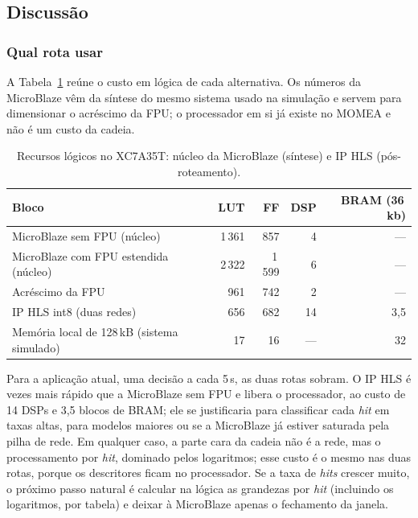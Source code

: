 \subsection{Discussão}
\label{sim:sec:discussao}

\subsubsection{Qual rota usar}

A Tabela~\ref{sim:tab:rotas} reúne o custo em lógica de cada alternativa. Os números da MicroBlaze vêm da síntese do mesmo sistema usado na simulação e servem para dimensionar o acréscimo da FPU; o processador em si já existe no MOMEA e não é um custo da cadeia.

\begin{table}[htbp]
	\centering
	\small
	\caption{Recursos lógicos no XC7A35T: núcleo da MicroBlaze (síntese) e IP HLS (pós-roteamento).}
	\label{sim:tab:rotas}
	\begin{tabular}{lrrrr}
		\toprule
		\textbf{Bloco} & \textbf{LUT} & \textbf{FF} & \textbf{DSP} & \textbf{BRAM (36\,kb)} \\
		\midrule
		MicroBlaze sem FPU (núcleo) & 1\,361 & 857 & 4 & --- \\
		MicroBlaze com FPU estendida (núcleo) & 2\,322 & 1\,599 & 6 & --- \\
		Acréscimo da FPU & 961 & 742 & 2 & --- \\
		IP HLS int8 (duas redes) & 656 & 682 & 14 & 3,5 \\
		Memória local de 128\,kB (sistema simulado) & 17 & 16 & --- & 32 \\
		\bottomrule
	\end{tabular}
\end{table}

Para a aplicação atual, uma decisão a cada 5\,s, as duas rotas sobram. \mbParagrafoRota{} O IP HLS é \mbFatorHls{} vezes mais rápido que a MicroBlaze sem FPU e libera o processador, ao custo de 14 DSPs e 3,5 blocos de BRAM; ele se justificaria para classificar cada \textit{hit} em taxas altas, para modelos maiores ou se a MicroBlaze já estiver saturada pela pilha de rede. Em qualquer caso, a parte cara da cadeia não é a rede, mas o processamento por \textit{hit}, dominado pelos logaritmos; esse custo é o mesmo nas duas rotas, porque os descritores ficam no processador. Se a taxa de \textit{hits} crescer muito, o próximo passo natural é calcular na lógica as grandezas por \textit{hit} (incluindo os logaritmos, por tabela) e deixar à MicroBlaze apenas o fechamento da janela.

